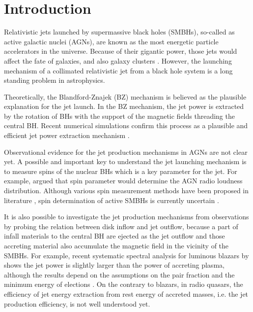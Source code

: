 \documentclass[preprint2,twocolappendix]{aastex6}
\begin{document}

\section{Introduction}
\label{sec:intro}
Relativistic jets launched by supermassive black holes (SMBHs), so-called as active galactic nuclei (AGNs), are known as the most energetic particle accelerators in the universe. Because of their gigantic power, those jets would affect the fate of galaxies, and also galaxy clusters \citep[e.g.][]{fab12}. However, the launching mechanism of a collimated relativistic jet from a black hole system is a long standing problem in astrophysics. 

Theoretically, the Blandford-Znajek (BZ) mechanism \citep{bla77} is believed as the plausible explanation for the jet launch. In the BZ mechanism, the jet power is extracted by the rotation of BHs with the support of the magnetic fields threading the central BH. Recent numerical simulations confirm this process as a plausible and efficient jet power extraction mechanism \citep[e.g.][]{kom07,tch10,tch11,mck12,tak16}. 

Observational evidence for the jet production mechanisms in AGNs are not clear yet. A possible and important key to understand the jet launching mechanism is to measure spins of the nuclear BHs which is a key parameter for the jet. For example, \citet{sik07} argued that spin parameter would determine the AGN radio loudness distribution. Although various spin measurement methods have been proposed in literature \citep[e.g.][and references therein]{mor15}, spin determination of active SMBHs is currently uncertain \citep[e.g.][]{mar11,bre11,kin13,liu15}. 

It is also possible to investigate the jet production mechanisms from observations by probing the relation between disk inflow and jet outflow, because a part of infall materials to the central BH are ejected as the jet outflow and those accreting material also accumulate the magnetic field in the vicinity of the SMBHs. For example, recent systematic spectral analysis for luminous blazars by \citet{ghi14} shows the jet power is slightly larger than the power of accreting plasma, although the results depend on the assumptions on the pair fraction and the minimum energy of elections \citep[e.g.][]{ino16,pja16}. On the contrary to blazars, in radio quasars, the efficiency of jet energy extraction from rest energy of accreted masses, i.e. the jet production efficiency, is not well understood yet.
\end{document}
